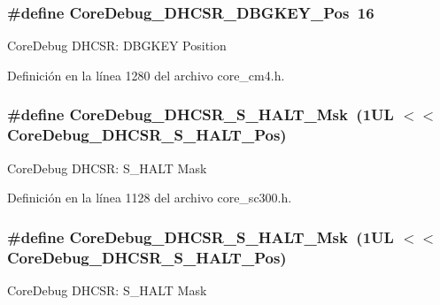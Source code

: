 \subsubsection[{\texorpdfstring{Core\+Debug\+\_\+\+D\+H\+C\+S\+R\+\_\+\+D\+B\+G\+K\+E\+Y\+\_\+\+Pos}{CoreDebug_DHCSR_DBGKEY_Pos}}]{\setlength{\rightskip}{0pt plus 5cm}\#define Core\+Debug\+\_\+\+D\+H\+C\+S\+R\+\_\+\+D\+B\+G\+K\+E\+Y\+\_\+\+Pos~16}\hypertarget{group___c_m_s_i_s___core_debug_gac91280edd0ce932665cf75a23d11d842}{}\label{group___c_m_s_i_s___core_debug_gac91280edd0ce932665cf75a23d11d842}
Core\+Debug D\+H\+C\+SR\+: D\+B\+G\+K\+EY Position 

Definición en la línea 1280 del archivo core\+\_\+cm4.\+h.

\subsubsection[{\texorpdfstring{Core\+Debug\+\_\+\+D\+H\+C\+S\+R\+\_\+\+S\+\_\+\+H\+A\+L\+T\+\_\+\+Msk}{CoreDebug_DHCSR_S_HALT_Msk}}]{\setlength{\rightskip}{0pt plus 5cm}\#define Core\+Debug\+\_\+\+D\+H\+C\+S\+R\+\_\+\+S\+\_\+\+H\+A\+L\+T\+\_\+\+Msk~(1\+U\+L $<$$<$ Core\+Debug\+\_\+\+D\+H\+C\+S\+R\+\_\+\+S\+\_\+\+H\+A\+L\+T\+\_\+\+Pos)}\hypertarget{group___c_m_s_i_s___core_debug_ga9f881ade3151a73bc5b02b73fe6473ca}{}\label{group___c_m_s_i_s___core_debug_ga9f881ade3151a73bc5b02b73fe6473ca}
Core\+Debug D\+H\+C\+SR\+: S\+\_\+\+H\+A\+LT Mask 

Definición en la línea 1128 del archivo core\+\_\+sc300.\+h.

\subsubsection[{\texorpdfstring{Core\+Debug\+\_\+\+D\+H\+C\+S\+R\+\_\+\+S\+\_\+\+H\+A\+L\+T\+\_\+\+Msk}{CoreDebug_DHCSR_S_HALT_Msk}}]{\setlength{\rightskip}{0pt plus 5cm}\#define Core\+Debug\+\_\+\+D\+H\+C\+S\+R\+\_\+\+S\+\_\+\+H\+A\+L\+T\+\_\+\+Msk~(1\+U\+L $<$$<$ Core\+Debug\+\_\+\+D\+H\+C\+S\+R\+\_\+\+S\+\_\+\+H\+A\+L\+T\+\_\+\+Pos)}\hypertarget{group___c_m_s_i_s___core_debug_ga9f881ade3151a73bc5b02b73fe6473ca}{}\label{group___c_m_s_i_s___core_debug_ga9f881ade3151a73bc5b02b73fe6473ca}
Core\+Debug D\+H\+C\+SR\+: S\+\_\+\+H\+A\+LT Mask 


